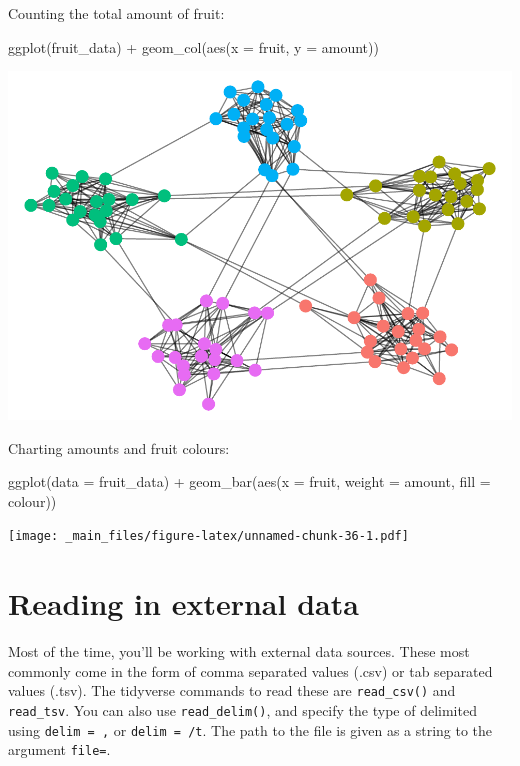 \documentclass[
]{book}
\newenvironment{Shaded}{\begin{snugshade}}{\end{snugshade}}
\newcommand{\AttributeTok}[1]{\textcolor[rgb]{0.77,0.63,0.00}{#1}}
\newcommand{\FunctionTok}[1]{\textcolor[rgb]{0.00,0.00,0.00}{#1}}
\newcommand{\NormalTok}[1]{#1}
\newcommand{\SpecialCharTok}[1]{\textcolor[rgb]{0.00,0.00,0.00}{#1}}
\begin{document}
Counting the total amount of fruit:

\begin{Shaded}
\begin{Highlighting}[]
\FunctionTok{ggplot}\NormalTok{(fruit\_data) }\SpecialCharTok{+} \FunctionTok{geom\_col}\NormalTok{(}\FunctionTok{aes}\NormalTok{(}\AttributeTok{x =}\NormalTok{ fruit, }\AttributeTok{y =}\NormalTok{ amount))}
\end{Highlighting}
\end{Shaded}

\includegraphics{_main_files/figure-latex/unnamed-chunk-35-1.pdf}

Charting amounts and fruit colours:

\begin{Shaded}
\begin{Highlighting}[]
\FunctionTok{ggplot}\NormalTok{(}\AttributeTok{data =}\NormalTok{ fruit\_data) }\SpecialCharTok{+} \FunctionTok{geom\_bar}\NormalTok{(}\FunctionTok{aes}\NormalTok{(}\AttributeTok{x =}\NormalTok{ fruit, }\AttributeTok{weight =}\NormalTok{ amount, }\AttributeTok{fill =}\NormalTok{ colour)) }
\end{Highlighting}
\end{Shaded}

\texttt{[image: \_main\_files/figure-latex/unnamed-chunk-36-1.pdf]}

\hypertarget{reading-in-external-data}{%
\section{Reading in external data}\label{reading-in-external-data}}

Most of the time, you'll be working with external data sources. These most commonly come in the form of comma separated values (.csv) or tab separated values (.tsv). The tidyverse commands to read these are \texttt{read\_csv()} and \texttt{read\_tsv}. You can also use \texttt{read\_delim()}, and specify the type of delimited using \texttt{delim\ =\ \textquotesingle{},\textquotesingle{}} or \texttt{delim\ =\ \textquotesingle{}/t}. The path to the file is given as a string to the argument \texttt{file=}.
\end{document}
